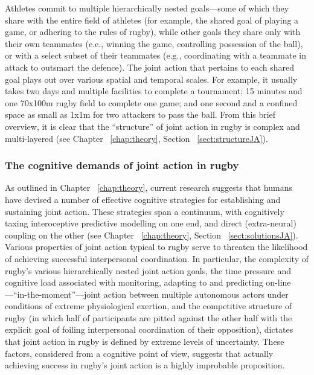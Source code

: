 \begin{CJK}{UTF8}{gbsn}
Athletes commit to multiple hierarchically nested goals---some of which they share with the entire field of athletes (for example, the shared goal of playing a game, or adhering to the rules of rugby), while other goals they share only with their own teammates (e.e., winning the game, controlling possession of the ball), or with a select subset of their teammates (e.g., coordinating with a teammate in attack to outsmart the defence).  The joint action that pertains to each shared goal plays out over various spatial and temporal scales.  For example, it usually takes two days and multiple facilities to complete a tournament; 15 minutes and one 70x100m rugby field to complete one game; and one second and a confined space as small as 1x1m for two attackers to pass the ball.  From this brief overview, it is clear that the ``structure'' of joint action in rugby is complex and multi-layered (see Chapter ~\ref{chap:theory}, Section ~\ref{sect:structureJA}).


\subsubsection{The cognitive demands of joint action in rugby}

As outlined in Chapter ~\ref{chap:theory}, current research suggests that humans have devised a number of effective cognitive strategies for establishing and sustaining joint action.  These strategies span a continuum, with cognitively taxing interoceptive predictive modelling on one end, and direct (extra-neural) coupling on the other (see Chapter ~\ref{chap:theory}, Section ~\ref{sect:solutionsJA}).  Various properties of joint action typical to rugby serve to threaten the likelihood of achieving successful interpersonal coordination.  In particular, the complexity of rugby's various hierarchically nested joint action goals, the time pressure and cognitive load associated with monitoring, adapting to and predicting on-line---``in-the-moment''---joint action between multiple autonomous actors under conditions of extreme physiological exertion, and the competitive structure of rugby (in which half of participants are pitted against the other half with the explicit goal of foiling interpersonal coordination of their opposition), dictates that joint action in rugby is defined by extreme levels of  uncertainty. These factors, considered from a cognitive point of view, suggests that actually achieving success in rugby's joint action is a highly improbable proposition.


\end{CJK}

